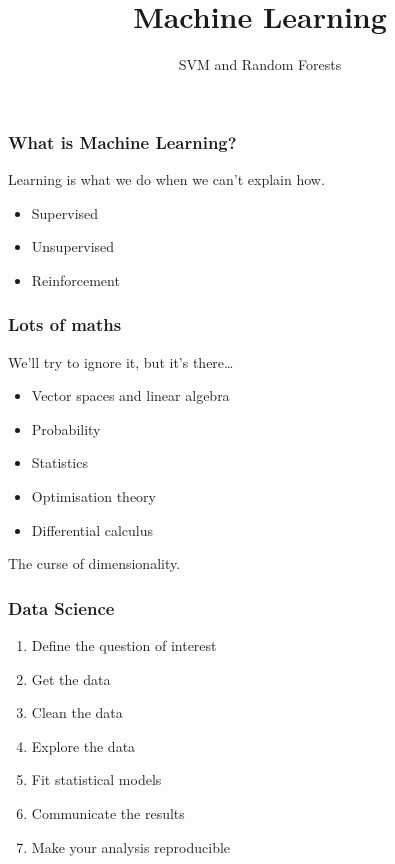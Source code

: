 
\title{Machine Learning}
\subtitle{SVM and Random Forests}




\begin{frame}
  \titlepage
\end{frame}


\begin{frame}
\end{frame}

\begin{frame}
  \frametitle{What is Machine Learning?}
  Learning is what we do when we can't explain how.
  \begin{itemize}
  \item Supervised
  \item Unsupervised
  \item Reinforcement
  \end{itemize}
\end{frame}

\begin{frame}
  \frametitle{Lots of maths}
  We'll try to ignore it, but it's there\dots
  \begin{itemize}
  \item Vector spaces and linear algebra
  \item Probability
  \item Statistics
  \item Optimisation theory
  \item Differential calculus
  \end{itemize}
  The curse of dimensionality.
\end{frame}

\begin{frame}
  \frametitle{Data Science}
  \begin{enumerate}
  \item Define the question of interest
  \item Get the data
  \item Clean the data
  \item Explore the data
  \item Fit statistical models
  \item Communicate the results
  \item Make your analysis reproducible
  \end{enumerate}
\end{frame}

